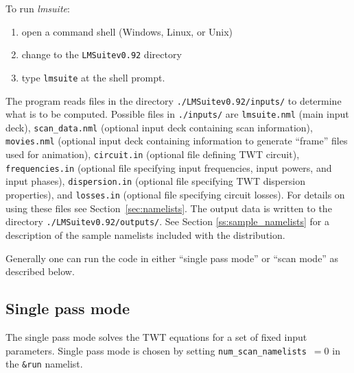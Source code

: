 \documentclass{article}
\begin{document}
To run {\em lmsuite}:
\begin{enumerate}
\item open a command shell (Windows, Linux, or Unix)
\item change to the {\tt LMSuitev0.92} directory
\item type {\tt lmsuite} at the shell prompt.
\end{enumerate}
The program
reads files in the directory {\tt ./LMSuitev0.92/inputs/} to determine
what is to be computed. Possible files in {\tt ./inputs/} are
{\tt lmsuite.nml} (main
input deck),
{\tt scan\_data.nml} (optional input deck containing scan
information),
{\tt movies.nml} (optional input deck containing information to
generate ``frame'' files used for animation),
{\tt circuit.in} (optional file defining TWT circuit),
{\tt frequencies.in} (optional file specifying input frequencies, input powers,
and input phases), {\tt dispersion.in} (optional file specifying TWT
dispersion properties), and {\tt losses.in} (optional file specifying
circuit losses). For details on using these files see
Section~\ref{sec:namelists}. The output data is written to the directory
{\tt ./LMSuitev0.92/outputs/}. See Section \ref{ss:sample_namelists}
for a description of the sample namelists included with the distribution.

Generally one can run the code in either ``single pass mode'' or ``scan mode''
as described below.

\subsection{Single pass mode}\label{ss:spm}
The single pass mode solves the TWT equations for a set of
fixed input parameters.
Single pass mode is chosen by setting {\tt num\_scan\_namelists}~$= 0$ in the
{\tt \&run} namelist.
\end{document}
